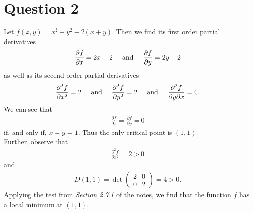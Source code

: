 \documentclass{article}
\newcommand{\p}{\partial }
\begin{document}
\section*{Question 2}
Let $f(x,y)=x^2+y^2-2(x+y)$. Then we find its first order partial derivatives
\begin{align*}
  \frac{\p f}{\p x}=2x-2 \text{\hspace{0.5cm}and\hspace{0.5cm}}
  \frac{\p f}{\p y}=2y-2
\end{align*}
as well as its second order partial derivatives
\begin{align*}
  \frac{\p^2 f}{\p x^2}=2\text{\hspace{0.5cm}and\hspace{0.5cm}}
  \frac{\p^2 f}{\p y^2}=2\text{\hspace{0.5cm}and\hspace{0.5cm}}
  \frac{\p^2 f}{\p y\p x}=0.
\end{align*}
We can see that
\begin{align*}
  \frac{\p f}{\p x} = \frac{\p f}{\p y} = 0
\end{align*}
if, and only if, $x=y=1$. Thus the only critical point is $(1,1)$.\\
Further, observe that
\begin{align*}
  \frac{\p^2 f}{\p x^2}=2>0
\end{align*}
and
\begin{align*}
  D(1,1) = \det \begin{pmatrix}
    2 & 0\\
    0 & 2
  \end{pmatrix}
  = 4 > 0.
\end{align*}
Applying the test from \emph{Section 2.7.1} of the notes, we find 
that the function $f$ has a local minimum at $(1,1)$.
\end{document}
